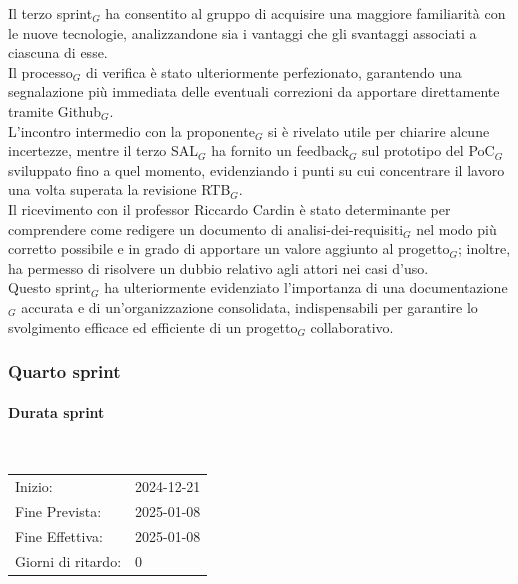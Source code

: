 \documentclass[10pt]{article}
\begin{document}
{{{{    Il terzo sprint$_G$ ha consentito al gruppo di acquisire una maggiore familiarità con le nuove tecnologie, analizzandone sia i vantaggi che gli svantaggi associati a ciascuna di esse.\\
    Il processo$_G$ di verifica è stato ulteriormente perfezionato, garantendo una segnalazione più immediata delle eventuali correzioni da apportare direttamente tramite Github$_G$.\\
    L'incontro intermedio con la proponente$_G$ si è rivelato utile per chiarire alcune incertezze, mentre il terzo SAL$_G$ ha fornito un feedback$_G$ sul prototipo del PoC$_G$ sviluppato fino a quel momento, evidenziando i punti su cui concentrare il lavoro una volta superata la revisione RTB$_G$.\\
    Il ricevimento con il professor Riccardo Cardin è stato determinante per comprendere come redigere un documento di analisi-dei-requisiti$_G$ nel modo più corretto possibile e in grado di apportare un valore aggiunto al progetto$_G$; inoltre, ha permesso di risolvere un dubbio relativo agli attori nei casi d'uso.\\
    Questo sprint$_G$ ha ulteriormente evidenziato l'importanza di una documentazione$_G$ accurata e di un'organizzazione consolidata, indispensabili per garantire lo svolgimento efficace ed efficiente di un progetto$_G$ collaborativo.


\newpage
\subsubsection{Quarto sprint}
\label{quarto-sprint$_G$}
    
    \paragraph{Durata sprint}\mbox{}\\
    \vspace{-1.5em}
    \begin{table}[h] 
    \renewcommand{\arraystretch}{1.2}  
    \begin{tabular}{ l l }
        Inizio: & 2024-12-21 \\
        Fine Prevista: & 2025-01-08 \\
        Fine Effettiva: & 2025-01-08 \\
        Giorni di ritardo: & 0 \\
    \end{tabular}
    \end{table}
    \vspace{-2em}
    {\renewcommand{\arraystretch}{1.5}%
    
}}}}}
\end{document}
